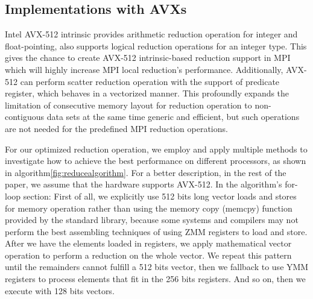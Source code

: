 \documentclass[5p,times,twocolumn]{elsarticle}
\newcommand{\mpi}[0]{\textsc{MPI}\xspace}
\begin{document}
\subsection{Implementations with AVXs}
Intel AVX-512 intrinsic provides arithmetic reduction operation for integer and
float-pointing, also supports logical reduction operations for an integer type.
This gives the chance to create AVX-512 intrinsic-based reduction support in \mpi which
will highly increase \mpi local reduction's performance.
Additionally, AVX-512 can perform scatter reduction operation with the
support of predicate register, which behaves in a vectorized manner. This profoundly
expands the limitation of consecutive memory layout for reduction operation to non-contiguous
data sets at the same time generic and efficient, but such operations
are not needed for the predefined MPI reduction operations.

%
For our optimized reduction operation, we employ and apply multiple
methods to investigate how to achieve the
best performance on different processors, as shown in algorithm\ref{fig:reducealgorithm}.
For a better description, in the rest of the paper, we assume that the hardware supports AVX-512.
In the algorithm's for-loop section: First of all, we explicitly use 512 bits long vector loads and stores for memory operation rather than using the memory copy (memcpy) function provided by
the standard library, because some systems and compilers may not perform
the best assembling techniques of using ZMM registers to load and store.
%
After we have the elements loaded in registers, we apply mathematical vector operation
to perform a reduction on the whole vector.
We repeat this pattern until the remainders cannot fulfill a 512 bits vector,
then we fallback to use YMM registers to process elements that fit in the 256 bits registers.
And so on, then we execute with 128 bits vectors.
\end{document}

